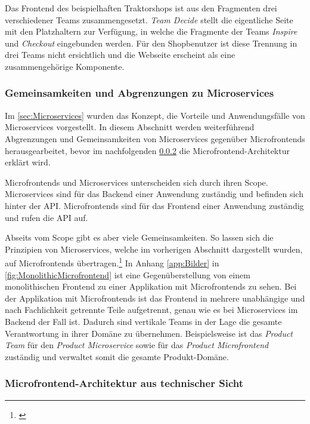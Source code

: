 Das Frontend des beispielhaften Traktorshops ist aus den Fragmenten drei verschiedener Teams zusammengesetzt. \textit{Team Decide} stellt die eigentliche Seite mit den Platzhaltern zur Verfügung, in welche die Fragmente der Teams \textit{Inspire} und \textit{Checkout} eingebunden werden. Für den Shopbenutzer ist diese Trennung in drei Teams nicht ersichtlich und die Webseite erscheint als eine zusammengehörige Komponente.

\subsubsection{Gemeinsamkeiten und Abgrenzungen zu Microservices}\label{sec:AbgrenzungenMicroservices}

Im \cref{sec:Microservices} wurden das Konzept, die Vorteile und Anwendungsfälle von Microservices vorgestellt. In diesem Abschnitt werden weiterführend Abgrenzungen und Gemeinsamkeiten von Microservices gegenüber Microfrontends herausgearbeitet, bevor im nachfolgenden \cref{sec:MicrofrontendArchitekturTechnisch} die Microfrontend-Architektur erklärt wird.

Microfrontends und Microservices unterscheiden sich durch ihren Scope. Microservices sind für das Backend einer Anwendung zuständig und befinden sich hinter der \gls{API}. Microfrontends sind für das Frontend einer Anwendung zuständig und rufen die \gls{API} auf.

Abseits vom Scope gibt es aber viele Gemeinsamkeiten. So lassen sich die Prinzipien von Microservices, welche im vorherigen Abschnitt dargestellt wurden, auf Microfrontends übertragen.\footnote{\cite[vgl.][18-20]{Mezzalira2021}} In Anhang \ref{app:Bilder} in \cref{fig:MonolithicMicrofrontend} ist eine Gegenüberstellung von einem monolithischen Frontend zu einer Applikation mit Microfrontends zu sehen. Bei der Applikation mit Microfrontends ist das Frontend in mehrere unabhängige und nach Fachlichkeit getrennte Teile aufgetrennt, genau wie es bei Microservices im Backend der Fall ist. Dadurch sind vertikale Teams in der Lage die gesamte Verantwortung in ihrer Domäne zu übernehmen. Beispielsweise ist das \textit{Product Team} für den \textit{Product Microservice} sowie für das \textit{Product Microfrontend} zuständig und verwaltet somit die gesamte Produkt-Domäne.

\subsubsection{Microfrontend-Architektur aus technischer Sicht}\label{sec:MicrofrontendArchitekturTechnisch}

